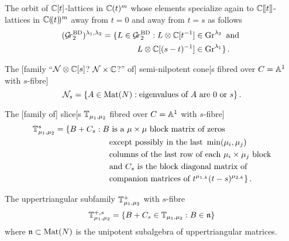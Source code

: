 \documentclass{article}
\begin{document}
The orbit of $\CC[t]$-lattices in $\CC(t)^m$ whose elements specialize again to $\CC\xt$-lattices in $\CC\xT^m$ away from $t = 0$ and away from $t = s$ as follows
\begin{equation}
    \label{eq:defGrBDlambda}
    \begin{split}
        (\Grbd[2])^{\lambda_1,\lambda_2} = \{L \in\Grbd[2] : L\otimes\CC[t^{-1}] &\in \Gr^{\lambda_2} \text{ and } \\
        L\otimes\CC[(s-t)^{-1}] &\in \Gr^{\lambda_1}\}\,.
    \end{split}
\end{equation}
% 

The [family ``$\cN\otimes\CC[s]$? $\cN\times\CC$?'' of] semi-nilpotent cone[s fibred over $C = \AA^1$ with $s$-fibre] 
\begin{equation}
    \cN_s = \{A \in \mat(N) : \text{eigenvalues of } A \text{ are } 0 \text{ or }s\}\,.
\end{equation}

The [family of] slice[s $\TT_{\mu_1,\mu_2}$ fibred over $C=\AA^1$ with $s$-fibre]
\begin{equation}
    \begin{split}
        \TT_{\mu_1,\mu_2}^s = \{ B + C_s: B &\text{ is a }\mu\times\mu \text{ block matrix of zeros} \\
        &\text{except possibly in the last }\min(\mu_i,\mu_j) \\ 
        &\text{columns of the last row of each }\mu_i\times\mu_j \text{ block} \\
        &\text{and } C_s \text{ is the block diagonal matrix of}\\
        &\text{companion matrices of } t^{\mu_{1,k}}(t-s)^{\mu_{2,k}}\}\,.
    \end{split}
\end{equation}

The uppertriangular subfamily $\TT_{\mu_1,\mu_2}^{+}$ with $s$-fibre
\begin{equation}
    \TT_{\mu_1,\mu_2}^{+,s} = \{B + C_s \in \TT_{\mu_1,\mu_2} : B \in\n\}
\end{equation}
where $\n\subset\mat(N)$ is the unipotent subalgebra of uppertriangular matrices. 
\end{document}

